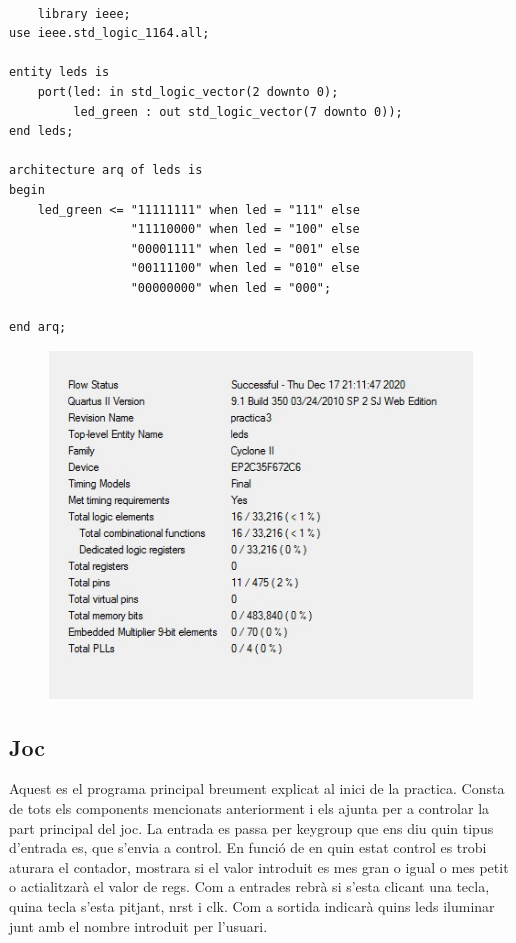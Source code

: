 \documentclass[12pt, a4papre]{article}
\begin{document}
		\begin{lstlisting}[style=vhdl, frame=single, basicstyle=\tiny]
		
	library ieee;
use ieee.std_logic_1164.all;

entity leds is
	port(led: in std_logic_vector(2 downto 0);
		 led_green : out std_logic_vector(7 downto 0));
end leds;

architecture arq of leds is
begin
	led_green <= "11111111" when led = "111" else
				 "11110000" when led = "100" else
				 "00001111" when led = "001" else
				 "00111100" when led = "010" else
				 "00000000" when led = "000";
				 
end arq;

		\end{lstlisting}
		
		
			\begin{figure}[H]
		\begin{center}
		\includegraphics[width=130mm]{informeLeds1.jpeg}
		\end{center}
	\end{figure}
	
	\subsection{Joc}
	Aquest es el programa principal breument explicat al inici de la practica. Consta de tots els components mencionats anteriorment i els ajunta per a controlar la part principal del joc. La entrada es passa per keygroup que ens diu quin tipus d'entrada es, que s'envia a control. En funció de en quin estat control es trobi aturara el contador, mostrara si el valor introduit es mes gran o igual o mes petit o actialitzarà el valor de regs. Com a entrades rebrà si s'esta clicant una tecla, quina tecla s'esta pitjant, nrst i clk. Com a sortida indicarà quins leds iluminar junt amb el nombre introduit per l'usuari.
	
\end{document}
